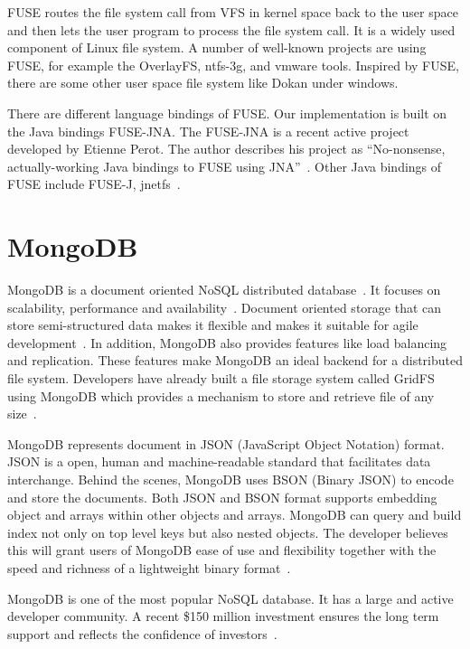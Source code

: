     FUSE routes the file system call from VFS in kernel space back to the user space and then lets the user program to process the file system call. It is a widely used component of Linux file system. A number of well-known projects are using FUSE, for example the OverlayFS, ntfs-3g, and vmware tools. Inspired by FUSE, there are some other user space file system like Dokan under windows.

    There are different language bindings of FUSE. Our implementation is built on the Java bindings FUSE-JNA. The FUSE-JNA is a recent active project developed by Etienne Perot. The author describes his project as ``No-nonsense, actually-working Java bindings to FUSE using JNA''~\cite{fusejna}. Other Java bindings of FUSE include FUSE-J, jnetfs~\cite{jnetfs}.

\section{MongoDB}

    MongoDB is a document oriented NoSQL distributed database~\cite{mongo_overview}. It focuses on scalability, performance and availability~\cite{mongo_overview}. Document oriented storage that can store semi-structured data makes it flexible and makes it suitable for agile development~\cite{docdb}. In addition, MongoDB also provides features like load balancing and replication. These features make MongoDB an ideal backend for a distributed file system. Developers have already built a file storage system called GridFS using MongoDB which provides a mechanism to store and retrieve file of any size~\cite{gridfs}.

    MongoDB represents document in JSON (JavaScript Object Notation) format. JSON is a open, human and machine-readable standard that facilitates data interchange. Behind the scenes, MongoDB uses BSON (Binary JSON) to encode and store the documents. Both JSON and BSON format supports embedding object and arrays within other objects and arrays. MongoDB can query and build index not only on top level keys but also nested objects. The developer believes this will grant users of MongoDB ease of use and flexibility together with the speed and richness of a lightweight binary format~\cite{bson}.

    MongoDB is one of the most popular NoSQL database. It has a large and active developer community. A recent \$150 million investment ensures the long term support and reflects the confidence of investors~\cite{mongInvest}.

